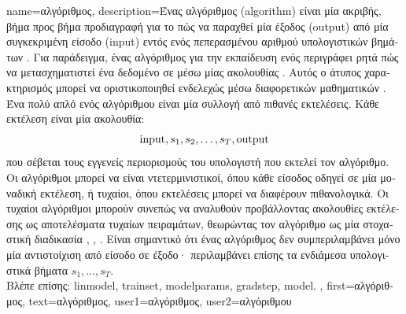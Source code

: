 {name={\foreignlanguage{greek}{αλγόριθμος}},
  description={\foreignlanguage{greek}{Ένας} \foreignlanguage{greek}{αλγόριθμος} (algorithm) 
  	\foreignlanguage{greek}{είναι μία ακριβής, βήμα προς βήμα προδιαγραφή για το πώς να παραχθεί μία έξοδος} (output) 
	\foreignlanguage{greek}{από μία συγκεκριμένη είσοδο} (input) \foreignlanguage{greek}{εντός ενός πεπερασμένου αριθμού υπολογιστικών βημάτων} \cite{Cormen:2022aa}. 
    	\foreignlanguage{greek}{Για παράδειγμα, ένας αλγόριθμος για την εκπαίδευση ενός}  \foreignlanguage{greek}{περιγράφει ρητά πώς να 
	μετασχηματιστεί ένα δεδομένο}  \foreignlanguage{greek}{σε}  \foreignlanguage{greek}{μέσω μίας ακολουθίας} 
	. \foreignlanguage{greek}{Αυτός ο άτυπος χαρακτηρισμός μπορεί να οριστικοποιηθεί ενδελεχώς μέσω διαφορετικών μαθηματικών} 
	 \cite{Sipser2013}. \foreignlanguage{greek}{Ένα πολύ απλό}  \foreignlanguage{greek}{ενός αλγόριθμου είναι μία 
	συλλογή από πιθανές εκτελέσεις. Κάθε εκτέλεση είναι μία ακολουθία:}
    	$${\rm input},s_1,s_2,\ldots,s_T,{\rm output}$$ 
    	\foreignlanguage{greek}{που σέβεται τους εγγενείς περιορισμούς του υπολογιστή που εκτελεί τον αλγόριθμο.}
	\foreignlanguage{greek}{Οι αλγόριθμοι μπορεί να είναι ντετερμινιστικοί, όπου κάθε είσοδος οδηγεί σε μία μοναδική εκτέλεση, 
	ή τυχαίοι, όπου εκτελέσεις μπορεί να διαφέρουν πιθανολογικά. Οι τυχαίοι αλγόριθμοι μπορούν συνεπώς να αναλυθούν προβάλλοντας 
	ακολουθίες εκτέλεσης ως αποτελέσματα τυχαίων πειραμάτων,
	θεωρώντας τον αλγόριθμο ως μία στοχαστική διαδικασία} \cite{BertsekasProb}, \cite{RandomizedAlgos}, \cite{Gallager13}.
	\foreignlanguage{greek}{Είναι σημαντικό ότι ένας αλγόριθμος δεν συμπεριλαμβάνει μόνο μία αντιστοίχιση από είσοδο σε έξοδο· 
	περιλαμβάνει επίσης τα ενδιάμεσα υπολογιστικά βήματα} 
	$s_1,\ldots,s_T$. \\
	\foreignlanguage{greek}{Βλέπε επίσης:} \gls{linmodel}, \gls{trainset}, \gls{modelparams}, \gls{gradstep}, \gls{model}.
	},
	first={\foreignlanguage{greek}{αλγόριθμος}},
	text={\foreignlanguage{greek}{αλγόριθμος}},
	user1={\foreignlanguage{greek}{αλγόριθμος}}, %
	user2={\foreignlanguage{greek}{αλγόριθμου}} %
}

